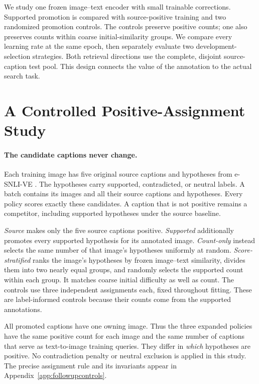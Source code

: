 \documentclass[11pt]{article}
\begin{document}
We study one frozen image--text encoder with small trainable corrections. Supported promotion is compared with source-positive training and two randomized promotion controls. The controls preserve positive counts; one also preserves counts within coarse initial-similarity groups. We compare every learning rate at the same epoch, then separately evaluate two development-selection strategies. Both retrieval directions use the complete, disjoint source-caption test pool. This design connects the value of the annotation to the actual search task.

\section{A Controlled Positive-Assignment Study}
\label{sec:study}
\paragraph{The candidate captions never change.}
Each training image has five original source captions and hypotheses from e-SNLI-VE \citep{kayser2021evil}. The hypotheses carry supported, contradicted, or neutral labels. A batch contains its images and all their source captions and hypotheses. Every policy scores exactly these candidates. A caption that is not positive remains a competitor, including supported hypotheses under the source baseline.

\emph{Source} makes only the five source captions positive. \emph{Supported} additionally promotes every supported hypothesis for its annotated image. \emph{Count-only} instead selects the same number of that image's hypotheses uniformly at random. \emph{Score-stratified} ranks the image's hypotheses by frozen image--text similarity, divides them into two nearly equal groups, and randomly selects the supported count within each group. It matches coarse initial difficulty as well as count. The controls use three independent assignments each, fixed throughout fitting. These are label-informed controls because their counts come from the supported annotations.

All promoted captions have one owning image. Thus the three expanded policies have the same positive count for each image and the same number of captions that serve as text-to-image training queries. They differ in \emph{which} hypotheses are positive. No contradiction penalty or neutral exclusion is applied in this study. The precise assignment rule and its invariants appear in Appendix~\ref{app:followupcontrols}.
\end{document}
